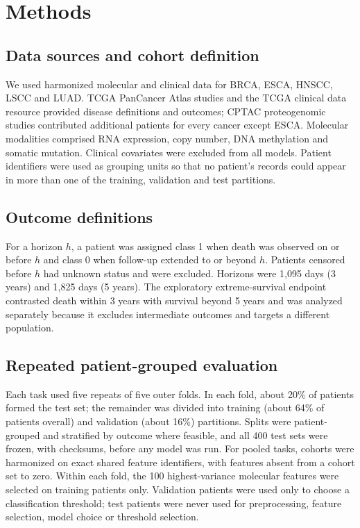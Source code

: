 \documentclass[11pt, a4paper, onecolumn, confidential, copyright]{hawkfranklin}
\begin{document}
\section{Methods}
\label{sec:methods}

\subsection{Data sources and cohort definition}

We used harmonized molecular and clinical data for BRCA, ESCA, HNSCC, LSCC and LUAD. TCGA PanCancer Atlas studies and the TCGA clinical data resource provided disease definitions and outcomes; CPTAC proteogenomic studies contributed additional patients for every cancer except ESCA.\citep{tcga2012brca,tcga2017esca,tcga2015hnsc,tcga2012lusc,tcga2014luad,liu2018clinical,li2023pancancer} Molecular modalities comprised RNA expression, copy number, DNA methylation and somatic mutation. Clinical covariates were excluded from all models. Patient identifiers were used as grouping units so that no patient's records could appear in more than one of the training, validation and test partitions.

\subsection{Outcome definitions}

For a horizon $h$, a patient was assigned class 1 when death was observed on or before $h$ and class 0 when follow-up extended to or beyond $h$. Patients censored before $h$ had unknown status and were excluded. Horizons were 1,095 days (3 years) and 1,825 days (5 years). The exploratory extreme-survival endpoint contrasted death within 3 years with survival beyond 5 years and was analyzed separately because it excludes intermediate outcomes and targets a different population.

\subsection{Repeated patient-grouped evaluation}

Each task used five repeats of five outer folds. In each fold, about 20\% of patients formed the test set; the remainder was divided into training (about 64\% of patients overall) and validation (about 16\%) partitions. Splits were patient-grouped and stratified by outcome where feasible, and all 400 test sets were frozen, with checksums, before any model was run. For pooled tasks, cohorts were harmonized on exact shared feature identifiers, with features absent from a cohort set to zero. Within each fold, the 100 highest-variance molecular features were selected on training patients only. Validation patients were used only to choose a classification threshold; test patients were never used for preprocessing, feature selection, model choice or threshold selection.
\end{document}
